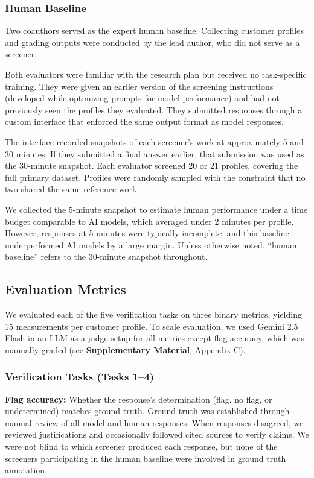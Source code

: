 \documentclass[utf8]{FrontiersinHarvard}
\begin{document}
\subsubsection{Human Baseline}

Two coauthors served as the expert human baseline. Collecting customer profiles and grading outputs were conducted by the lead author, who did not serve as a screener.

Both evaluators were familiar with the research plan but received no task-specific training. They were given an earlier version of the screening instructions (developed while optimizing prompts for model performance) and had not previously seen the profiles they evaluated. They submitted responses through a custom interface that enforced the same output format as model responses.

The interface recorded snapshots of each screener's work at approximately 5 and 30 minutes. If they submitted a final answer earlier, that submission was used as the 30-minute snapshot. Each evaluator screened 20 or 21 profiles, covering the full primary dataset. Profiles were randomly sampled with the constraint that no two shared the same reference work.

We collected the 5-minute snapshot to estimate human performance under a time budget comparable to AI models, which averaged under 2 minutes per profile. However, responses at 5 minutes were typically incomplete, and this baseline underperformed AI models by a large margin. Unless otherwise noted, ``human baseline'' refers to the 30-minute snapshot throughout.

\subsection{Evaluation Metrics}

We evaluated each of the five verification tasks on three binary metrics, yielding 15 measurements per customer profile. To scale evaluation, we used Gemini 2.5 Flash in an LLM-as-a-judge setup for all metrics except flag accuracy, which was manually graded (see \textbf{Supplementary Material}, Appendix C).

\subsubsection{Verification Tasks (Tasks 1--4)}

\textbf{Flag accuracy:} Whether the response's determination (flag, no flag, or undetermined) matches ground truth. Ground truth was established through manual review of all model and human responses. When responses disagreed, we reviewed justifications and occasionally followed cited sources to verify claims. We were not blind to which screener produced each response, but none of the screeners participating in the human baseline were involved in ground truth annotation.
\end{document}
